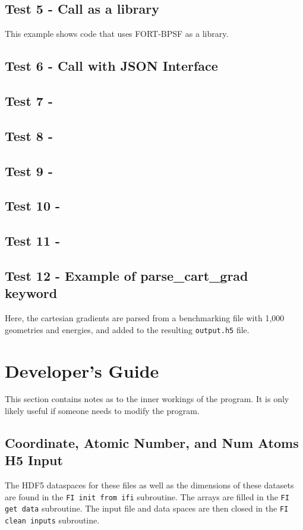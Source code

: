 \documentclass{article}
\begin{document}
\subsection{Test 5 - Call as a library}
This example shows code that uses FORT-BPSF as a library.

\subsection{Test 6 - Call with JSON Interface}
\subsection{Test 7 - }
\subsection{Test 8 - }
\subsection{Test 9 - }
\subsection{Test 10 - }
\subsection{Test 11 - }
\subsection{Test 12 - Example of parse\_cart\_grad keyword}
Here, the cartesian gradients are parsed from a benchmarking file with 1,000 geometries and energies, and added to the resulting \texttt{output.h5} file.

\section{Developer's Guide}
This section contains notes as to the inner workings of the program.
It is only likely useful if someone needs to modify the program.

\subsection{Coordinate, Atomic Number, and Num Atoms H5 Input}
The HDF5 dataspaces for these files as well as the dimensions of these datasets are found in the \texttt{FI init from ifi} subroutine.
The arrays are filled in the \texttt{FI get data} subroutine.
The input file and data spaces are then closed in the \texttt{FI clean inputs} subroutine.
\end{document}
